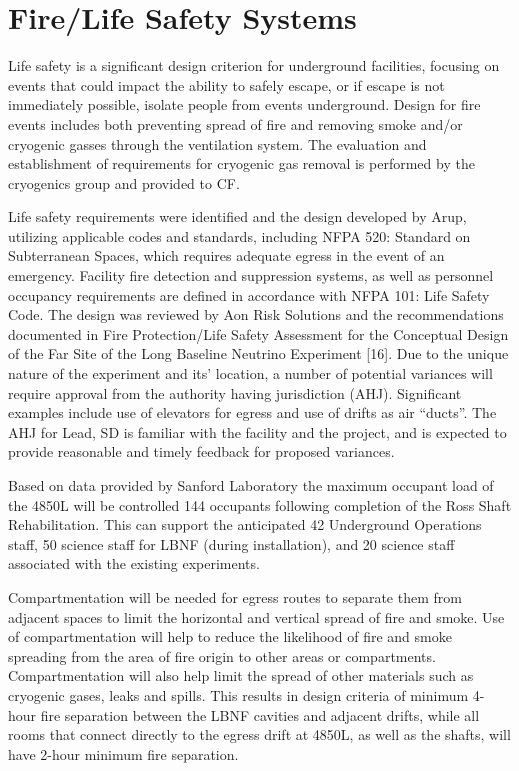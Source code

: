 \section{Fire/Life Safety Systems }
\label{sec:fscf-und-fire}

Life safety is a significant design criterion for underground facilities, focusing on events that could impact the ability to safely escape, or if escape is not immediately possible, isolate people from events underground. Design for fire events includes both preventing spread of fire and removing smoke and/or cryogenic gasses through the ventilation system. The evaluation and establishment of requirements for cryogenic gas removal is performed by the cryogenics group and provided to CF.

Life safety requirements were identified and the design developed by Arup, utilizing applicable codes and standards, including NFPA 520: Standard on Subterranean Spaces, which requires adequate egress in the event of an emergency. Facility fire detection and suppression systems, as well as personnel occupancy requirements are defined in accordance with NFPA 101: Life Safety Code. The design was reviewed by Aon Risk Solutions and the recommendations documented in Fire Protection/Life Safety Assessment for the Conceptual Design of the Far Site of the Long Baseline Neutrino Experiment [16]. Due to the unique nature of the experiment and its’ location, a number of potential variances will require approval from the authority having jurisdiction (AHJ).  Significant examples include use of elevators for egress and use of drifts as air “ducts”.  The AHJ for Lead, SD is familiar with the facility and the project, and is expected to provide reasonable and timely feedback for proposed variances.

Based on data provided by Sanford Laboratory the maximum occupant load of the 4850L will be controlled 144 occupants following completion of the Ross Shaft Rehabilitation. This can support the anticipated 42 Underground Operations staff, 50 science staff for LBNF (during installation), and 20 science staff associated with the existing experiments. 

Compartmentation will be needed for egress routes to separate them from adjacent spaces to limit the horizontal and vertical spread of fire and smoke. Use of compartmentation will help to reduce the likelihood of fire and smoke spreading from the area of fire origin to other areas or compartments. Compartmentation will also help limit the spread of other materials such as cryogenic gases, leaks and spills. This results in design criteria of minimum 4-hour fire separation between the LBNF cavities and adjacent drifts, while all rooms that connect directly to the egress drift at 4850L, as well as the shafts, will have 2-hour minimum fire separation.

